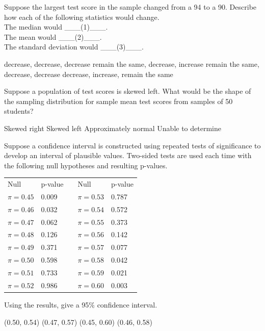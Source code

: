 \documentclass{article}
\begin{document}
\begin{mcquestions}
		Suppose the largest test score in the sample changed from a 94 to a 90. Describe how each of the following statistics would change.\\
		The median would \_\_\_(1)\_\_\_.\\
		The mean would \_\_\_(2)\_\_\_.\\
		The standard deviation would \_\_\_(3)\_\_\_.
		
		\begin{mcanswerslist}
			\answer decrease, decrease, decrease
			\answer remain the same, decrease, increase
			\answer[correct] remain the same, decrease, decrease
			\answer decrease, increase, remain the same			
		\end{mcanswerslist}
		
		\question Suppose a population of test scores is skewed left. What would be the shape of the sampling distribution for sample mean test scores from samples of 50 students?
		\begin{mcanswerslist}
			\answer Skewed right
			\answer Skewed left
			\answer[correct] Approximately normal
			\answer Unable to determine
		\end{mcanswerslist}
		
		\question Suppose a confidence interval is constructed using repeated tests of significance to develop an interval of plausible values.  Two-sided tests are used each time with the following null hypotheses and resulting p-values.
		\begin{center}
			\begin{tabular}{llp{.75in}ll}
				Null              & p-value & & Null              & p-value  \\
				$\pi = 0.45$ & 0.009   &                                 & $\pi = 0.53$ & 0.787    \\
				$\pi = 0.46$ & 0.032   &                                 & $\pi = 0.54$ & 0.572    \\
				$\pi = 0.47$ & 0.062   &                                 & $\pi = 0.55$ & 0.373    \\
				$\pi = 0.48$ & 0.126   &                                 & $\pi = 0.56$ & 0.142    \\
				$\pi = 0.49$ & 0.371   &                                 & $\pi = 0.57$ & 0.077    \\
				$\pi = 0.50$ & 0.598   &                                 & $\pi = 0.58$ & 0.042    \\
				$\pi = 0.51$ & 0.733   &                                 & $\pi = 0.59$ & 0.021    \\
				$\pi = 0.52$ & 0.986   &                                 & $\pi = 0.60$ & 0.003   
			\end{tabular}
		\end{center}
		Using the results, give a 95\% confidence interval.
		\begin{mcanswerslist}
			\answer (0.50, 0.54)
			\answer[correct] (0.47, 0.57)
			\answer (0.45, 0.60)
			\answer (0.46, 0.58)
		\end{mcanswerslist}
		

\end{mcquestions}
\end{document}
